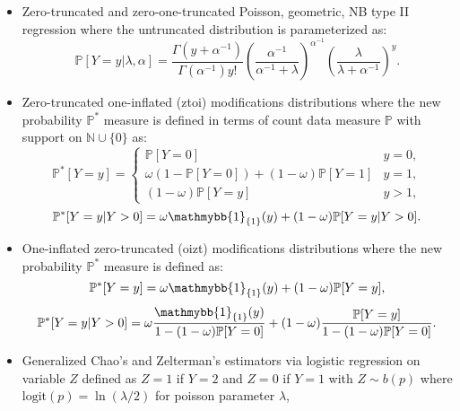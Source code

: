 \documentclass[
]{jss}
\newcommand{\1}{\mathmybb{1}} \newcommand{\bx}{\boldsymbol{x}}
\begin{document}
\begin{itemize}
    \item Zero-truncated and zero-one-truncated Poisson, geometric, NB type II regression where the untruncated distribution is parameterized as:
    \begin{equation*}
        \mathbb{P}[Y=y|\lambda,\alpha] = \frac{\Gamma\left(y+\alpha^{-1}\right)}{\Gamma\left(\alpha^{-1}\right)y!}
        \left(\frac{\alpha^{-1}}{\alpha^{-1}+\lambda}\right)^{\alpha^{-1}}
        \left(\frac{\lambda}{\lambda + \alpha^{-1}}\right)^{y}.
    \end{equation*}
    \item Zero-truncated one-inflated (ztoi) modifications distributions where the new probability $\mathbb{P}^{\ast}$ measure is defined in terms of count data measure $\mathbb{P}$ with support on $\mathbb{N}\cup\{0\}$ as:
    \begin{equation*}
    \mathbb{P}^{\ast}[Y=y]=
    \begin{cases}
    \mathbb{P}[Y=0] & y=0, \\
    \omega\left(1-\mathbb{P}[Y=0]\right)+(1-\omega)\mathbb{P}[Y=1] & y=1, \\
    (1-\omega)\mathbb{P}[Y=y] & y>1,
    \end{cases}
    \end{equation*}
    \begin{equation*}
        \mathbb{P}^{\ast}[Y=y|Y>0]=\omega\mathmybb{1}_{\{1\}}(y)+(1-\omega)\mathbb{P}[Y=y|Y>0].
    \end{equation*}
    \item One-inflated zero-truncated (oizt) modifications distributions where the new probability $\mathbb{P}^{\ast}$ measure is defined as:
    \begin{equation*}
        \mathbb{P}^{\ast}[Y=y] = \omega \mathmybb{1}_{\{1\}}(y)+(1-\omega)\mathbb{P}[Y=y],
    \end{equation*}
    \begin{equation*}
        \mathbb{P}^{\ast}[Y=y|Y>0] = 
        \omega\frac{\mathmybb{1}_{\{1\}}(y)}{1-(1-\omega)\mathbb{P}[Y=0]}+
        (1-\omega)\frac{\mathbb{P}[Y=y]}{1-(1-\omega)\mathbb{P}[Y=0]}.
    \end{equation*}
    \item Generalized Chao's and Zelterman's estimators via logistic regression on variable $Z$ defined as $Z=1$ if $Y=2$ and $Z=0$ if $Y=1$ with $Z\sim b(p)$ where $\text{logit}(p)=\ln(\lambda/2)$ for poisson parameter $\lambda$,
    \begin{align}

\end{align}
\end{itemize}
\end{document}
